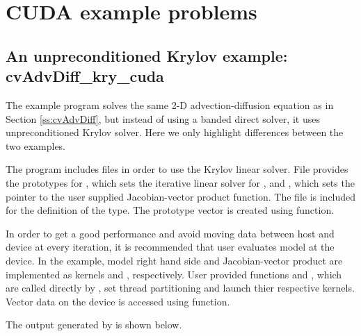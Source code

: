 \section{CUDA example problems}\label{s:ex_cuda}



\subsection{An unpreconditioned Krylov example: cvAdvDiff\_kry\_cuda}\label{ss:cvAdvDiff_cuda}

The example program  solves the same 2-D 
advection-diffusion equation as in Section \ref{ss:cvAdvDiff}, but
instead of using a banded direct solver, it uses unpreconditioned 
Krylov solver. Here we only highlight differences between the two 
examples. 

The  program includes files
 in order to use the {\spgmr}
Krylov linear solver. File  provides the prototypes for 
, which sets the iterative linear solver for
{\cvode}, and , which sets the pointer to the user
supplied Jacobian-vector product function.
The file  is included for the definition of the {\cuda}
 type. The prototype vector is created
using  function. 

In order to get a good performance and avoid moving data between host
and device at every iteration, it is recommended that user evaluates  
model at the device. In the example, model right hand side and Jacobian-vector
product are implemented as {\cuda} kernels  and ,
respectively. User provided {\CC} functions  and , which are called
directly by {\cvode}, set thread partitioning and launch thier respective 
{\cuda} kernels. Vector data on the device is accessed using 
 function.

The output generated by  is shown below.



